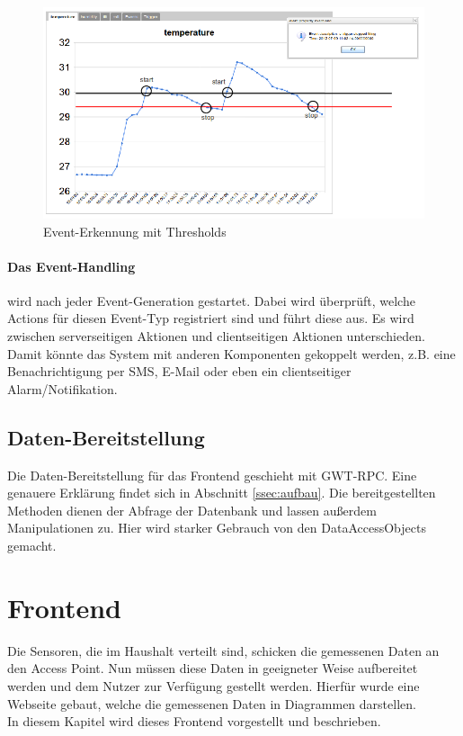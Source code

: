 \documentclass[12pt,a4paper,twoside]{article}
\begin{document}
\begin{figure}[htbp]
   \centering
   \includegraphics[width=12cm]{fig/threshold.png}
   \caption{Event-Erkennung mit Thresholds}
   \label{event-detection}
\end{figure}

\paragraph{Das Event-Handling} wird nach jeder Event-Generation gestartet. Dabei wird überprüft, welche Actions für diesen Event-Typ registriert sind und führt diese aus. Es wird zwischen serverseitigen Aktionen und clientseitigen Aktionen unterschieden. Damit könnte das System mit anderen Komponenten gekoppelt werden, z.B. eine Benachrichtigung per SMS, E-Mail oder eben ein clientseitiger Alarm/Notifikation.

\subsection{Daten-Bereitstellung}Die Daten-Bereitstellung für das Frontend geschieht mit GWT-RPC. Eine genauere Erklärung findet sich in Abschnitt \ref{ssec:aufbau}. Die bereitgestellten Methoden dienen der Abfrage der Datenbank und lassen außerdem Manipulationen zu. Hier wird starker Gebrauch von den DataAccessObjects gemacht.

\section{Frontend}\label{sec:frontend}
Die Sensoren, die im Haushalt verteilt sind, schicken die gemessenen Daten an den Access Point. Nun müssen diese Daten in geeigneter Weise aufbereitet werden und dem Nutzer zur Verfügung gestellt werden. Hierfür wurde eine Webseite gebaut, welche die gemessenen Daten in Diagrammen darstellen. \\
In diesem Kapitel wird dieses Frontend vorgestellt und beschrieben.
\end{document}

